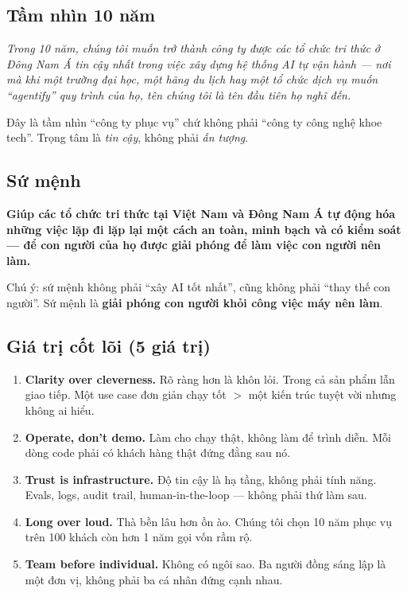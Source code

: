 \documentclass[11pt,a4paper]{article}
\begin{document}
\subsection{Tầm nhìn 10 năm}

\begin{quotebox}
\textit{Trong 10 năm, chúng tôi muốn trở thành công ty được các tổ chức tri thức
ở Đông Nam Á tin cậy nhất trong việc xây dựng hệ thống AI tự vận hành — nơi mà
khi một trường đại học, một hãng du lịch hay một tổ chức dịch vụ muốn ``agentify''
quy trình của họ, tên chúng tôi là tên đầu tiên họ nghĩ đến.}
\end{quotebox}

Đây là tầm nhìn ``công ty phục vụ'' chứ không phải ``công ty công nghệ khoe tech''.
Trọng tâm là \textit{tin cậy}, không phải \textit{ấn tượng}.

\subsection{Sứ mệnh}

\textbf{Giúp các tổ chức tri thức tại Việt Nam và Đông Nam Á tự động hóa những
việc lặp đi lặp lại một cách an toàn, minh bạch và có kiểm soát — để con người
của họ được giải phóng để làm việc con người nên làm.}

Chú ý: sứ mệnh không phải ``xây AI tốt nhất'', cũng không phải ``thay thế con người''.
Sứ mệnh là \textbf{giải phóng con người khỏi công việc máy nên làm}.

\subsection{Giá trị cốt lõi (5 giá trị)}

\begin{enumerate}
\item \textbf{Clarity over cleverness.} Rõ ràng hơn là khôn lỏi. Trong cả sản phẩm
lẫn giao tiếp. Một use case đơn giản chạy tốt $>$ một kiến trúc tuyệt vời nhưng
không ai hiểu.

\item \textbf{Operate, don't demo.} Làm cho chạy thật, không làm để trình diễn.
Mỗi dòng code phải có khách hàng thật đứng đằng sau nó.

\item \textbf{Trust is infrastructure.} Độ tin cậy là hạ tầng, không phải tính năng.
Evals, logs, audit trail, human-in-the-loop — không phải thứ làm sau.

\item \textbf{Long over loud.} Thà bền lâu hơn ồn ào. Chúng tôi chọn 10 năm phục vụ
trên 100 khách còn hơn 1 năm gọi vốn rầm rộ.

\item \textbf{Team before individual.} Không có ngôi sao. Ba người đồng sáng lập là
một đơn vị, không phải ba cá nhân đứng cạnh nhau.
\end{enumerate}
\end{document}
